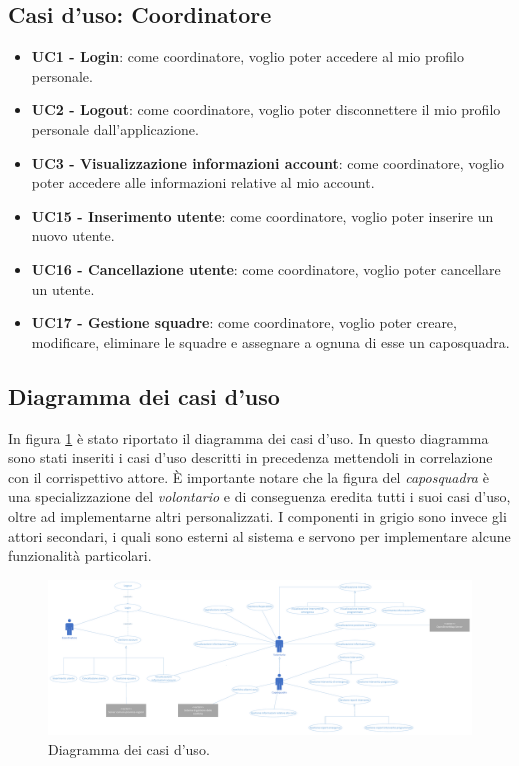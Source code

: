 \subsection{Casi d'uso: Coordinatore}
\begin{itemize}
	\item \textbf{UC1 - Login}:
	come coordinatore, voglio poter accedere al mio profilo personale.
	
	\item \textbf{UC2 - Logout}:
	come coordinatore, voglio poter disconnettere il mio profilo personale dall'applicazione.
	
	\item \textbf{UC3 - Visualizzazione informazioni account}:
	come coordinatore, voglio poter accedere alle informazioni relative al mio account.
	
	\item \textbf{UC15 - Inserimento utente}:
	come coordinatore, voglio poter inserire un nuovo utente.
	
	\item \textbf{UC16 - Cancellazione utente}:
	come coordinatore, voglio poter cancellare un utente.
	
	\item \textbf{UC17 - Gestione squadre}:
	come coordinatore, voglio poter creare, modificare, eliminare le squadre e assegnare a ognuna di esse un caposquadra.
\end{itemize}

\clearpage

\begin{landscape}
	\subsection{Diagramma dei casi d'uso}
	In figura \ref{fig:UseCaseDiagram} è stato riportato il diagramma dei casi d'uso. In questo diagramma sono stati inseriti i casi d'uso descritti in precedenza mettendoli in correlazione con il corrispettivo attore. È importante notare che la figura del \textit{caposquadra} è una specializzazione del \textit{volontario} e di conseguenza eredita tutti i suoi casi d'uso, oltre ad implementarne altri personalizzati. 
	I componenti in grigio sono invece gli attori secondari, i quali sono esterni al sistema e servono per implementare alcune funzionalità particolari.
	
	\begin{figure}[tbh!]
		\centering
		\includegraphics[width=1.1\linewidth]{./Iterazione 0/OtherFiles/Use cases diagram}
		\caption{Diagramma dei casi d'uso.}
		\label{fig:UseCaseDiagram}
	\end{figure}
\end{landscape}

